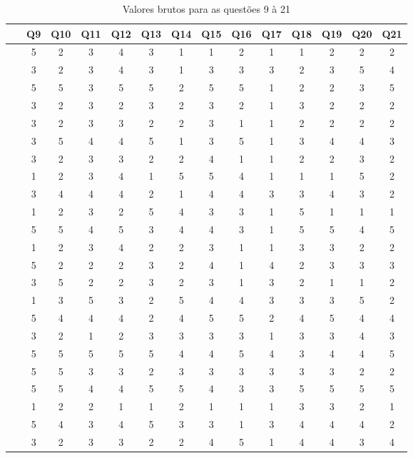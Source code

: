 \documentclass[twoside,english,brazilian]{UNISINOSartigo}
\begin{document}
\begin{table}[h]
\footnotesize
    \caption{Valores brutos para as questões 9 à 21}
    \begin{tabularx}{\columnwidth}{cccccccccccccc}
    \hline
    ~       & Q9   & Q10  & Q11  & Q12  & Q13  & Q14  & Q15  & Q16  & Q17  & Q18  & Q19  & Q20  & Q21  \\\hline
~ & 5 & 2 & 3 & 4 & 3 & 1 & 1 & 2 & 1 & 1 & 2 & 2 & 2 \\
~ & 3 & 2 & 3 & 4 & 3 & 1 & 3 & 3 & 3 & 2 & 3 & 5 & 4 \\
~ & 5 & 5 & 3 & 5 & 5 & 2 & 5 & 5 & 1 & 2 & 2 & 3 & 5 \\
~ & 3 & 2 & 3 & 2 & 3 & 2 & 3 & 2 & 1 & 3 & 2 & 2 & 2 \\
~ & 3 & 2 & 3 & 3 & 2 & 2 & 3 & 1 & 1 & 2 & 2 & 2 & 2 \\
~ & 3 & 5 & 4 & 4 & 5 & 1 & 3 & 5 & 1 & 3 & 4 & 4 & 3 \\
~ & 3 & 2 & 3 & 3 & 2 & 2 & 4 & 1 & 1 & 2 & 2 & 3 & 2 \\
~ & 1 & 2 & 3 & 4 & 1 & 5 & 5 & 4 & 1 & 1 & 1 & 5 & 2 \\
~ & 3 & 4 & 4 & 4 & 2 & 1 & 4 & 4 & 3 & 3 & 4 & 3 & 2 \\
~ & 1 & 2 & 3 & 2 & 5 & 4 & 3 & 3 & 1 & 5 & 1 & 1 & 1 \\
~ & 5 & 5 & 4 & 5 & 3 & 4 & 4 & 3 & 1 & 5 & 5 & 4 & 5 \\
~ & 1 & 2 & 3 & 4 & 2 & 2 & 3 & 1 & 1 & 3 & 3 & 2 & 2 \\
~ & 5 & 2 & 2 & 2 & 3 & 2 & 4 & 1 & 4 & 2 & 3 & 3 & 3 \\
~ & 3 & 5 & 2 & 2 & 3 & 2 & 3 & 1 & 3 & 2 & 1 & 1 & 2 \\
~ & 1 & 3 & 5 & 3 & 2 & 5 & 4 & 4 & 3 & 3 & 3 & 5 & 2 \\
~ & 5 & 4 & 4 & 4 & 2 & 4 & 5 & 5 & 2 & 4 & 5 & 4 & 4 \\
~ & 3 & 2 & 1 & 2 & 3 & 3 & 3 & 3 & 1 & 3 & 3 & 4 & 3 \\
~ & 5 & 5 & 5 & 5 & 5 & 4 & 4 & 5 & 4 & 3 & 4 & 4 & 5 \\
~ & 5 & 5 & 3 & 3 & 2 & 3 & 3 & 3 & 3 & 3 & 3 & 2 & 2 \\
~ & 5 & 5 & 4 & 4 & 5 & 5 & 4 & 3 & 3 & 5 & 5 & 5 & 5 \\
~ & 1 & 2 & 2 & 1 & 1 & 2 & 1 & 1 & 1 & 3 & 3 & 2 & 1 \\
~ & 5 & 4 & 3 & 4 & 5 & 3 & 3 & 1 & 3 & 4 & 4 & 4 & 2 \\
~ & 3 & 2 & 3 & 3 & 2 & 2 & 4 & 5 & 1 & 4 & 4 & 3 & 4 \\

\end{tabularx}
\end{table}
\end{document}
